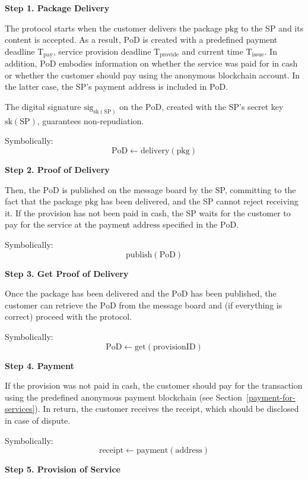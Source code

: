 \documentclass[pdftex,twocolumn,epjc3]{svjour3}
\begin{document}
{\noindent \textbf
{Step 1. Package Delivery}\label{step-1-package-delivery}

The protocol starts when the customer delivers the package $\mathrm{pkg}$ to the SP and its content is accepted. As a result, $\mathrm{PoD}$ is created with a predefined payment deadline $\mathrm{T}_\mathrm{pay}$, service provision deadline $\mathrm{T}_\mathrm{provide}$ and current time $\mathrm{T}_\mathrm{issue}$. In addition, $\mathrm{PoD}$ embodies information on whether the service was paid for in cash or whether the customer should pay using the anonymous blockchain account. In the latter case, the SP's payment $\mathrm{address}$ is included in $\mathrm{PoD}$.

The digital signature $\mathrm{sig}_{\mathrm{sk}(\mathrm{SP})}$ on the $\mathrm{PoD}$, created with the SP's secret key $\mathrm{sk}(\mathrm{SP})$, guarantees non-repudiation.

Symbolically: 
\[
\mathrm{PoD \gets delivery(pkg)}
\]

\noindent \textbf
{Step 2. Proof of Delivery}\label{step-2-pod}

Then, the $\mathrm{PoD}$ is published on the message board by the SP, committing to the fact that the package $\mathrm{pkg}$ has been delivered, and the SP cannot reject receiving it. If the provision has not been paid in cash, the SP waits for the customer to pay for the service at the payment $\mathrm{address}$ specified in the $\mathrm{PoD}$.

Symbolically: 
\[
\mathrm{publish(PoD)}
\]

\noindent \textbf
{Step 3. Get Proof of Delivery}\label{step-3-get-pod}

Once the package has been delivered and the $\mathrm{PoD}$ has been published, the customer can retrieve the $\mathrm{PoD}$ from the message board and (if everything is correct) proceed with the protocol.

Symbolically: 
\[
\mathrm{PoD \gets get(provisionID)}
\]

\noindent \textbf
{Step 4. Payment}\label{step-4-payment}

If the provision was not paid in cash, the customer should pay for the transaction using the predefined anonymous payment blockchain (see Section~\ref{payment-for-services}).
In return, the customer receives the $\mathrm{receipt}$, which should be disclosed in case of dispute.

Symbolically: 
\[
\mathrm{receipt \gets payment(address)}
\]

\noindent \textbf
{Step 5. Provision of Service}\label{step-5-provision-of-service} 

}
\end{document}
